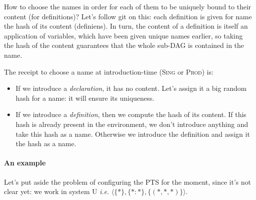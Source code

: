 \documentclass[12pt]{article}
\begin{document}
How to choose the names in order for each of them to be uniquely bound
to their content (for definitions)? Let's follow \textsf{git} on this:
each definition is given for name the hash of its content
(definiens). In turn, the content of a definition is itself an
application of variables, which have been given unique names earlier,
so taking the hash of the content guarantees that the whole sub-DAG is
contained in the name.

The receipt to choose a name at introduction-time (\textsc{Sing} or
\textsc{Prod}) is:
\begin{itemize}
\item If we introduce a \emph{declaration}, it has no content. Let's
  assign it a big random hash for a name: it will ensure its
  uniqueness.
\item If we introduce a \emph{definition}, then we compute the hash of
  its content. If this hash is already present in the environment, we
  don't introduce anything and take this hash as a name. Otherwise we
  introduce the definition and assign it the hash as a name.
\end{itemize}

\paragraph{An example}

Let's put aside the problem of configuring the PTS for the moment,
since it's not clear yet: we work in system U \emph{i.e.}
$\langle\{*\},\{*:*\},\{(*,*,*)\}\rangle$.
\end{document}
